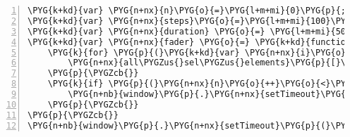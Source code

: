 \begin{Verbatim}[commandchars=\\\{\},numbers=left,stepnumber=1,codes={\catcode`\$=3\catcode`\^=7\catcode`\_=8}]
\PYG{k+kd}{var} \PYG{n+nx}{n}\PYG{o}{=}\PYG{l+m+mi}{0}\PYG{p}{;}
\PYG{k+kd}{var} \PYG{n+nx}{steps}\PYG{o}{=}\PYG{l+m+mi}{100}\PYG{p}{;}
\PYG{k+kd}{var} \PYG{n+nx}{duration} \PYG{o}{=} \PYG{l+m+mi}{500}\PYG{p}{.}\PYG{p}{;}
\PYG{k+kd}{var} \PYG{n+nx}{fader} \PYG{o}{=} \PYG{k+kd}{function}\PYG{p}{(}\PYG{p}{)}\PYG{p}{\PYGZob{}}
    \PYG{k}{for} \PYG{p}{(}\PYG{k+kd}{var} \PYG{n+nx}{i}\PYG{o}{=}\PYG{l+m+mi}{0}\PYG{p}{;} \PYG{n+nx}{i}\PYG{o}{<}\PYG{n+nx}{all\PYGZus{}sel\PYGZus{}elements}\PYG{p}{.}\PYG{n+nx}{length}\PYG{p}{;} \PYG{n+nx}{i}\PYG{o}{++}\PYG{p}{)} \PYG{p}{\PYGZob{}}
        \PYG{n+nx}{all\PYGZus{}sel\PYGZus{}elements}\PYG{p}{[}\PYG{n+nx}{i}\PYG{p}{]}\PYG{p}{.}\PYG{n+nx}{style}\PYG{p}{.}\PYG{n+nx}{opacity} \PYG{o}{+=} \PYG{l+m+mi}{1}\PYG{p}{.}\PYG{o}{/}\PYG{n+nx}{steps}\PYG{p}{;}
    \PYG{p}{\PYGZcb{}}
    \PYG{k}{if} \PYG{p}{(}\PYG{n+nx}{n}\PYG{o}{++}\PYG{o}{<}\PYG{n+nx}{steps}\PYG{p}{)}\PYG{p}{\PYGZob{}}
        \PYG{n+nb}{window}\PYG{p}{.}\PYG{n+nx}{setTimeout}\PYG{p}{(}\PYG{n+nx}{fader}\PYG{p}{,} \PYG{n+nx}{duration}\PYG{o}{/}\PYG{n+nx}{steps}\PYG{p}{)}\PYG{p}{;}
    \PYG{p}{\PYGZcb{}}
\PYG{p}{\PYGZcb{}}
\PYG{n+nb}{window}\PYG{p}{.}\PYG{n+nx}{setTimeout}\PYG{p}{(}\PYG{n+nx}{fader}\PYG{p}{,} \PYG{n+nx}{duration}\PYG{o}{/}\PYG{n+nx}{steps}\PYG{p}{)}\PYG{p}{;}
\end{Verbatim}
